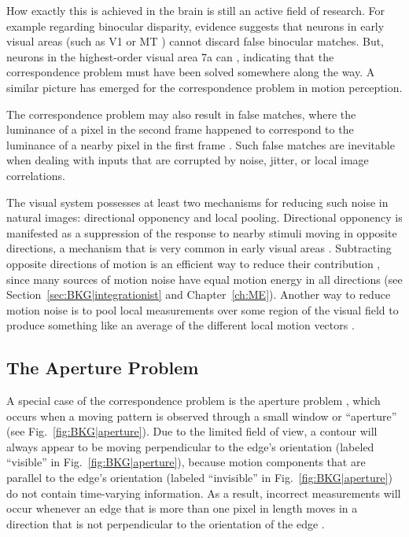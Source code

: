 How exactly this is achieved in the brain is still an active field of research.
For example regarding binocular disparity, 
evidence suggests that neurons in early visual areas 
(such as \ac{V1} \citep{CummingParker1997} or \ac{MT} \citep{Krug1999})
cannot discard false binocular matches. 
But, neurons in the highest-order visual area 7a can \citep{Janssen2003}, 
indicating that the correspondence problem must have been solved somewhere
along the way. 
A similar picture has emerged for the correspondence problem in motion perception.

The correspondence problem may also result in false matches, 
where the luminance
of a pixel in the second frame happened to correspond to the 
luminance of a nearby pixel in the first frame \citep{PackBorn2008}.
Such false matches are inevitable when dealing with inputs that are corrupted by
noise, jitter, or local image correlations.

The visual system possesses at least two mechanisms for reducing such noise in
natural images: directional opponency and local pooling.
Directional opponency is manifested as a suppression of the response
to nearby stimuli moving in opposite directions, a mechanism that is very common
in early visual areas \citep{Snowden1991,QianAndersen1994}.
Subtracting opposite directions of motion is an efficient way to reduce their
contribution \citep{PackBorn2008}, since many sources of motion noise have
equal motion energy in all directions (see Section~\ref{sec:BKG|integrationist}
and Chapter~\ref{ch:ME}).
Another way to reduce motion noise is to pool local measurements over some region of
the visual field to produce something like an average of the different local
motion vectors \citep{LisbergerFerrera1997,Recanzone1997,BrittenHeuer1999}.


\subsection{The Aperture Problem}
\label{sec:BKG|aperture}
A special case of the correspondence problem 
is the aperture problem \citep{Marr1982},
which occurs when a moving pattern is observed through a small window
or ``aperture'' (see Fig.~\ref{fig:BKG|aperture}).
Due to the limited field of view, a contour will always appear to
be moving perpendicular to the edge's orientation (labeled ``visible''
in Fig.~\ref{fig:BKG|aperture}), 
because motion components that are parallel to the edge's orientation 
(labeled ``invisible'' in Fig.~\ref{fig:BKG|aperture})
do not contain time-varying information.
As a result, incorrect measurements will occur whenever an edge that is more than
one pixel in length moves in a direction that is not perpendicular to the
orientation of the edge \citep{PackBorn2008}.

